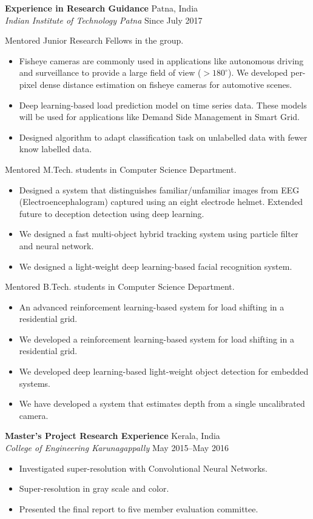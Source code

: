 \documentclass[12pt]{res} %
\begin{document}
\begin{resume}
\textbf {Experience in Research Guidance} \hfill Patna, India \\ 
{\sl Indian Institute of Technology Patna} \hfill Since July 2017

Mentored Junior Research Fellows in the group.
\begin{itemize}
\item Fisheye cameras are commonly used in applications like autonomous driving and surveillance to provide a large field of view ($>180^{\circ}$). We developed per-pixel dense distance estimation on fisheye cameras for automotive scenes. 
\item Deep learning-based load prediction model on time series data. These models will be used for applications like Demand Side Management in Smart Grid.
\item Designed algorithm to adapt classification task on unlabelled data with fewer know labelled data. 
\end{itemize}


Mentored M.Tech. students in Computer Science Department.
\begin{itemize}
\item Designed a system that distinguishes familiar/unfamiliar images from EEG (Electroencephalogram) captured using an eight electrode helmet. Extended future to deception detection using deep learning.
\item We designed a fast multi-object hybrid tracking system using particle filter and neural network.
\item We designed a light-weight deep learning-based facial recognition system.
\end{itemize}

Mentored B.Tech. students in Computer Science Department. 
\begin{itemize}
\item An advanced reinforcement learning-based system for load shifting in a residential grid.
\item We developed a reinforcement learning-based system for load shifting in a residential grid. 
\item We developed deep learning-based light-weight object detection for embedded systems.
\item We have developed a system that estimates depth from a single uncalibrated camera.
\end{itemize}

\textbf {Master's Project Research Experience} \hfill  Kerala, India \\ 
{\sl College of Engineering Karunagappally} \hfill May 2015--May 2016 
\vspace{5pt}
\begin{itemize}
\item Investigated super-resolution with Convolutional Neural Networks.
\item Super-resolution in gray scale and color.
\item Presented the final report to five member evaluation committee.
\end{itemize}




\end{resume}
\end{document}
